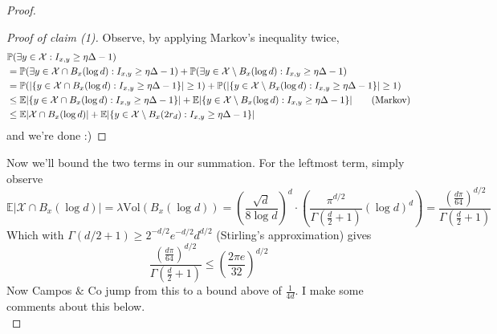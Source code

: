 \documentclass{article}
\begin{document}
\begin{proof}
    \begin{proof}[Proof of claim (1)]
        Observe, by applying Markov's inequality twice,
        \begin{align*}
            &\mathbb{P}(\exists y \in \mathcal{X} : I_{x,y} \geq \eta \Delta - 1) \\
             &= \mathbb{P}(\exists y \in \mathcal{X} \cap B_x(\log d) : I_{x,y} \geq \eta \Delta - 1)
            + \mathbb{P}(\exists y \in \mathcal{X} \setminus B_x(\log d) : I_{x,y} \geq \eta \Delta - 1) \\
            &= \mathbb{P}(|\{y \in \mathcal{X} \cap B_x(\log d) : I_{x,y} \geq \eta \Delta - 1\}| \geq 1) + 
            \mathbb{P}(|\{y \in \mathcal{X} \setminus B_x(\log d) : I_{x,y} \geq \eta \Delta - 1\}| \geq 1) \\
            &\leq \mathbb{E}|\{y \in \mathcal{X} \cap B_x(\log d) : I_{x,y} \geq \eta \Delta - 1\}| + 
            \mathbb{E}|\{y \in \mathcal{X} \setminus B_x(\log d) : I_{x,y} \geq \eta \Delta - 1\}| 
            \tag{\text{Markov}} \\
            &\leq \mathbb{E}|\mathcal{X} \cap B_x(\log d)| + \mathbb{E}|\{y \in \mathcal{X} \setminus B_x(2r_d) : I_{x,y} \geq \eta \Delta - 1\}| 
        \end{align*}
        and we're done :)
    \end{proof}
    Now we'll bound the two terms in our summation. For the leftmost term, simply observe 
    \[\mathbb{E}|\mathcal{X} \cap B_x(\log d)| = \lambda \text{Vol}(B_x(\log d)) 
    = \left(\frac{\sqrt{d}}{8\log d}\right)^d \cdot \left(\frac{\pi^{d/2}}{\Gamma(\frac{d}{2} + 1)}(\log d)^d\right)
    = \frac{\left(\frac{d\pi}{64}\right)^{d/2}}{\Gamma(\frac{d}{2} + 1)}\]
    Which with $\Gamma(d/2 + 1) \geq 2^{-d/2}e^{-d/2}d^{d/2}$ (Stirling's approximation) gives 
    \[\frac{\left(\frac{d\pi}{64}\right)^{d/2}}{\Gamma(\frac{d}{2} + 1)} \leq \left(\frac{2\pi e}{32}\right)^{d/2}\]
    Now Campos $\&$ Co jump from this to a bound above of $\frac{1}{4d}$. I make some comments about this below. \\


\end{proof}
\end{document}
